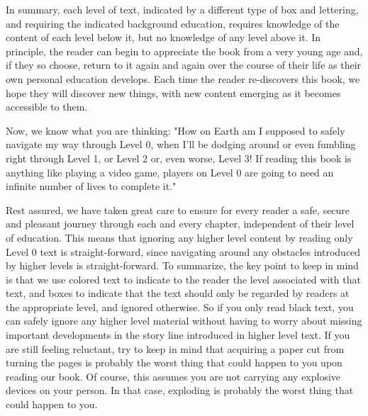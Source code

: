 \documentclass[main.tex]{subfiles}
\begin{document}
\par \nar In summary, each level of text, indicated by a different type of box and lettering, and requiring the indicated background education, requires knowledge of the content of each level below it, but no knowledge of any level above it.  In principle, the reader can begin to appreciate the book from a very young age and, if they so choose, return to it again and again over the course of their life as their own personal education develops.  Each time the reader re-discovers this book, we hope they will discover new things, with new content emerging as it becomes accessible to them.

\par \nar Now, we know what you are thinking:  "How on Earth am I supposed to safely navigate my way through Level 0, when I'll be dodging around or even fumbling right through Level 1, or Level 2 or, even worse, Level 3!  If reading this book is anything like playing a video game, players on Level 0 are going to need an infinite number of lives to complete it." 

\par \nar Rest assured, we have taken great care to ensure for every reader a safe, secure and pleasant journey through each and every chapter, independent of their level of education.  This means that ignoring any higher level content by reading only Level 0 text is straight-forward, since navigating around any obstacles introduced by higher levels is straight-forward.  
To summarize, the key point to keep in mind is that we use colored text to indicate to the reader the level associated with that text, and boxes to indicate that the text should only be regarded by readers at the appropriate level, and ignored otherwise.  So if you only read black text, you can safely ignore any higher level material without having to worry about missing important developments in the story line introduced in higher level text.
If you are still feeling reluctant, try to keep in mind that acquiring a paper cut from turning the pages is probably the worst thing that could happen to you upon reading our book.  Of course, this assumes you are not carrying any explosive devices on your person. In that case, exploding is probably the worst thing that could happen to you.
\end{document}
